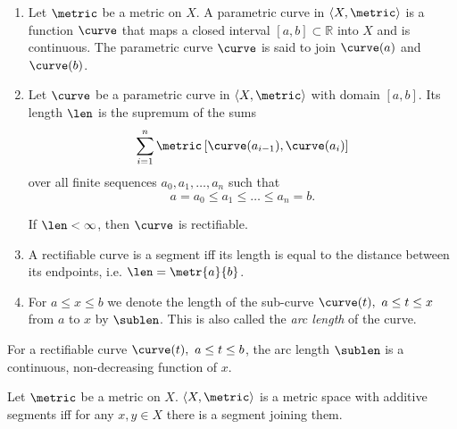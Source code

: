   \begin{defi}
\leavevmode \vspace{-\baselineskip}
\begin{enumerate}
    \item Let $\metric$ be a metric on $X$. A parametric curve in $\langle X, \metric \rangle$ is a function $\curve$ that maps a closed interval $[a, b] \subset \mathbb{R}$ into $X$ and is continuous. The parametric curve $\curve$ is said to join $\curve(a)$ and $\curve(b)$.
    
    \item Let $\curve$ be a parametric curve in $\langle X, \metric \rangle$ with domain $[a, b]$. Its length $\len$ is the supremum of the sums
\[
    \sum_{i=1}^{n} \metric \left[ \curve(a_{i-1}), \curve(a_i) \right]
\]
    over all finite sequences $a_0, a_1, \dots, a_n$ such that 
\[
    a = a_0 \leq a_1 \leq \dots \leq a_n = b.
\]
    
    If $\len < \infty$, then $\curve$ is rectifiable.
    
  \item A rectifiable curve is a segment iff its length is equal to the distance between its endpoints, i.e. $\len = \metr{a}{b}$.
    
  \item For $a \leq x \leq b$ we denote the length of the sub-curve $\curve(t),~ a \leq t \leq x$ from $a$ to $x$ by $\sublen$. This is also called the \emph{arc length} of the curve. \label{sublen}
\end{enumerate}
\end{defi}

\begin{rem} \label{sublen-cont}
For a rectifiable curve $\curve(t), ~ a \leq t \leq b$, the arc length $\sublen$ is a continuous, non-decreasing function of $x$.
\end{rem}

  \begin{defi}
    Let $\metric$ be a metric on $X$. $\langle X, \metric \rangle$ is a metric space with additive segments iff for any $x, y \in  X$ there is a segment joining them.
  \end{defi}


